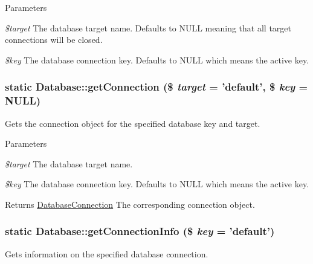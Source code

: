 \begin{DoxyParams}{Parameters}
\item[{\em \$target}]The database target name. Defaults to NULL meaning that all target connections will be closed. \item[{\em \$key}]The database connection key. Defaults to NULL which means the active key. \end{DoxyParams}
\hypertarget{classDatabase_aa8e4f73dfd6ad94a166a6fa3e44351cf}{
\subsubsection[{getConnection}]{\setlength{\rightskip}{0pt plus 5cm}static Database::getConnection (\$ {\em target} = {\ttfamily 'default'}, \/  \$ {\em key} = {\ttfamily NULL})}}
\label{classDatabase_aa8e4f73dfd6ad94a166a6fa3e44351cf}
Gets the connection object for the specified database key and target.


\begin{DoxyParams}{Parameters}
\item[{\em \$target}]The database target name. \item[{\em \$key}]The database connection key. Defaults to NULL which means the active key.\end{DoxyParams}
\begin{DoxyReturn}{Returns}
\hyperlink{classDatabaseConnection}{DatabaseConnection} The corresponding connection object. 
\end{DoxyReturn}
\hypertarget{classDatabase_a4ddbb695ae89b6180e0390c231b70ea5}{
\subsubsection[{getConnectionInfo}]{\setlength{\rightskip}{0pt plus 5cm}static Database::getConnectionInfo (\$ {\em key} = {\ttfamily 'default'})}}
\label{classDatabase_a4ddbb695ae89b6180e0390c231b70ea5}
Gets information on the specified database connection.


